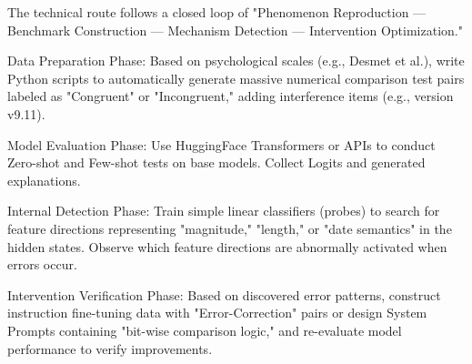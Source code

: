 The technical route follows a closed loop of "Phenomenon Reproduction — Benchmark Construction — Mechanism Detection — Intervention Optimization."

Data Preparation Phase: Based on psychological scales (e.g., Desmet et al.), write Python scripts to automatically generate massive numerical comparison test pairs labeled as "Congruent" or "Incongruent," adding interference items (e.g., version v9.11).

Model Evaluation Phase: Use HuggingFace Transformers or APIs to conduct Zero-shot and Few-shot tests on base models. Collect Logits and generated explanations.

Internal Detection Phase: Train simple linear classifiers (probes) to search for feature directions representing "magnitude," "length," or "date semantics" in the hidden states. Observe which feature directions are abnormally activated when errors occur.

Intervention Verification Phase: Based on discovered error patterns, construct instruction fine-tuning data with "Error-Correction" pairs or design System Prompts containing "bit-wise comparison logic," and re-evaluate model performance to verify improvements\cite{meng2022}.
